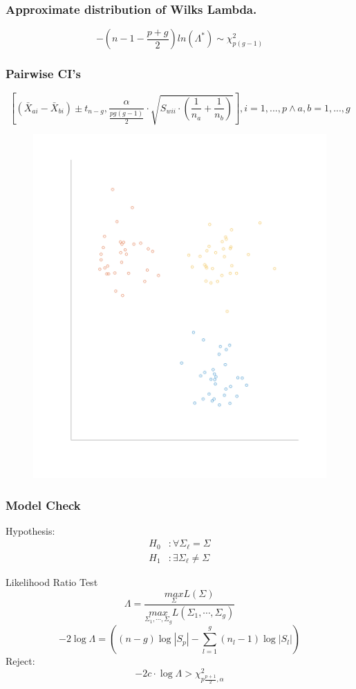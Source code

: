 \documentclass[aspectratio=169,10pt,t]{beamer}
\begin{document}
\begin{frame}[t]
	\frametitle{Approximate distribution of Wilks Lambda.}
	\[
		-\left(n-1-\frac{p+g}{2}\right)ln\left( \Lambda^*\right) \sim \chi^2_{p(g-1)}
	\]  
\end{frame}

\begin{frame}[t]
	\frametitle{Pairwise CI's}
	\[
		\left[
			( \bar{X}_{ai} - \bar{X}_{bi}  ) 
			\pm t_{n-g},
			\frac{\alpha}{ \frac{pg(g-1)}{2} } \cdot 
			\sqrt{S_{wii} \cdot \left(  \frac{1}{n_a} + \frac{1}{n_b}  \right) }
	\right] , i = 1,...,p \land a,b = 1,...,g
	\] 

	\begin{figure}[H]
		\includegraphics[scale=0.2]{clusters.png}
	\end{figure}
\end{frame}


\begin{frame}[t]
	\frametitle{Model Check}
	Hypothesis:
	\[
		\begin{aligned}
			H_0 &: \forall \Sigma_\ell = \Sigma\\
			H_1 &: \exists \Sigma_\ell \neq \Sigma
		\end{aligned}
	\] 

	Likelihood Ratio Test
	\[
		\Lambda = \frac{\underset{\Sigma}{max}L(\Sigma)}{\underset{\Sigma_1,\cdots,\Sigma_g}{max}L(\Sigma_1,\cdots,\Sigma_g)} 
	\] 
	\[
		-2\log\Lambda =  \left((n-g)\log|S_p| - \sum^{g}_{l=1}(n_l - 1) \log|S_l| \right) 
	\]
	Reject:
	\[
		-2c \cdot \log\Lambda > \chi^2_{p \frac{p+1}{2}, \alpha}
	\] 

\end{frame}
\end{document}
